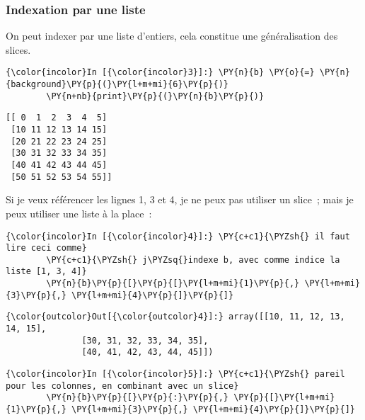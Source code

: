     \hypertarget{indexation-par-une-liste}{%
\subsubsection{Indexation par une
liste}\label{indexation-par-une-liste}}

    On peut indexer par une liste d'entiers, cela constitue une
généralisation des slices.

    \begin{Verbatim}[commandchars=\\\{\}]
{\color{incolor}In [{\color{incolor}3}]:} \PY{n}{b} \PY{o}{=} \PY{n}{background}\PY{p}{(}\PY{l+m+mi}{6}\PY{p}{)}
        \PY{n+nb}{print}\PY{p}{(}\PY{n}{b}\PY{p}{)}
\end{Verbatim}


    \begin{Verbatim}[commandchars=\\\{\}]
[[ 0  1  2  3  4  5]
 [10 11 12 13 14 15]
 [20 21 22 23 24 25]
 [30 31 32 33 34 35]
 [40 41 42 43 44 45]
 [50 51 52 53 54 55]]

    \end{Verbatim}

    Si je veux référencer les lignes 1, 3 et 4, je ne peux pas utiliser un
slice~; mais je peux utiliser une liste à la place~:

    \begin{Verbatim}[commandchars=\\\{\}]
{\color{incolor}In [{\color{incolor}4}]:} \PY{c+c1}{\PYZsh{} il faut lire ceci comme}
        \PY{c+c1}{\PYZsh{} j\PYZsq{}indexe b, avec comme indice la liste [1, 3, 4]}
        \PY{n}{b}\PY{p}{[}\PY{p}{[}\PY{l+m+mi}{1}\PY{p}{,} \PY{l+m+mi}{3}\PY{p}{,} \PY{l+m+mi}{4}\PY{p}{]}\PY{p}{]}
\end{Verbatim}


\begin{Verbatim}[commandchars=\\\{\}]
{\color{outcolor}Out[{\color{outcolor}4}]:} array([[10, 11, 12, 13, 14, 15],
               [30, 31, 32, 33, 34, 35],
               [40, 41, 42, 43, 44, 45]])
\end{Verbatim}
            
    \begin{Verbatim}[commandchars=\\\{\}]
{\color{incolor}In [{\color{incolor}5}]:} \PY{c+c1}{\PYZsh{} pareil pour les colonnes, en combinant avec un slice}
        \PY{n}{b}\PY{p}{[}\PY{p}{:}\PY{p}{,} \PY{p}{[}\PY{l+m+mi}{1}\PY{p}{,} \PY{l+m+mi}{3}\PY{p}{,} \PY{l+m+mi}{4}\PY{p}{]}\PY{p}{]}
\end{Verbatim}


